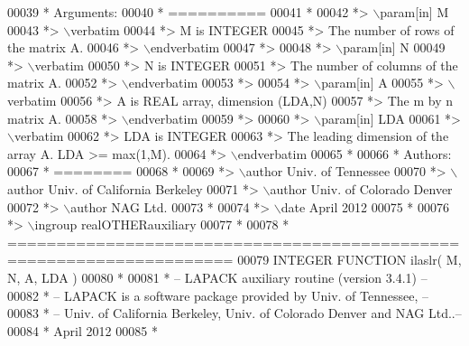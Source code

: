 \begin{DoxyCode}
00039 \textcolor{comment}{*  Arguments:}
00040 \textcolor{comment}{*  ==========}
00041 \textcolor{comment}{*}
00042 \textcolor{comment}{*> \(\backslash\)param[in] M}
00043 \textcolor{comment}{*> \(\backslash\)verbatim}
00044 \textcolor{comment}{*>          M is INTEGER}
00045 \textcolor{comment}{*>          The number of rows of the matrix A.}
00046 \textcolor{comment}{*> \(\backslash\)endverbatim}
00047 \textcolor{comment}{*>}
00048 \textcolor{comment}{*> \(\backslash\)param[in] N}
00049 \textcolor{comment}{*> \(\backslash\)verbatim}
00050 \textcolor{comment}{*>          N is INTEGER}
00051 \textcolor{comment}{*>          The number of columns of the matrix A.}
00052 \textcolor{comment}{*> \(\backslash\)endverbatim}
00053 \textcolor{comment}{*>}
00054 \textcolor{comment}{*> \(\backslash\)param[in] A}
00055 \textcolor{comment}{*> \(\backslash\)verbatim}
00056 \textcolor{comment}{*>          A is REAL array, dimension (LDA,N)}
00057 \textcolor{comment}{*>          The m by n matrix A.}
00058 \textcolor{comment}{*> \(\backslash\)endverbatim}
00059 \textcolor{comment}{*>}
00060 \textcolor{comment}{*> \(\backslash\)param[in] LDA}
00061 \textcolor{comment}{*> \(\backslash\)verbatim}
00062 \textcolor{comment}{*>          LDA is INTEGER}
00063 \textcolor{comment}{*>          The leading dimension of the array A. LDA >= max(1,M).}
00064 \textcolor{comment}{*> \(\backslash\)endverbatim}
00065 \textcolor{comment}{*}
00066 \textcolor{comment}{*  Authors:}
00067 \textcolor{comment}{*  ========}
00068 \textcolor{comment}{*}
00069 \textcolor{comment}{*> \(\backslash\)author Univ. of Tennessee }
00070 \textcolor{comment}{*> \(\backslash\)author Univ. of California Berkeley }
00071 \textcolor{comment}{*> \(\backslash\)author Univ. of Colorado Denver }
00072 \textcolor{comment}{*> \(\backslash\)author NAG Ltd. }
00073 \textcolor{comment}{*}
00074 \textcolor{comment}{*> \(\backslash\)date April 2012}
00075 \textcolor{comment}{*}
00076 \textcolor{comment}{*> \(\backslash\)ingroup realOTHERauxiliary}
00077 \textcolor{comment}{*}
00078 \textcolor{comment}{*  =====================================================================}
00079 \textcolor{keyword}{      INTEGER }\textcolor{keyword}{FUNCTION }ilaslr( M, N, A, LDA )
00080 \textcolor{comment}{*}
00081 \textcolor{comment}{*  -- LAPACK auxiliary routine (version 3.4.1) --}
00082 \textcolor{comment}{*  -- LAPACK is a software package provided by Univ. of Tennessee,    --}
00083 \textcolor{comment}{*  -- Univ. of California Berkeley, Univ. of Colorado Denver and NAG Ltd..--}
00084 \textcolor{comment}{*     April 2012}
00085 \textcolor{comment}{*}

\end{DoxyCode}
